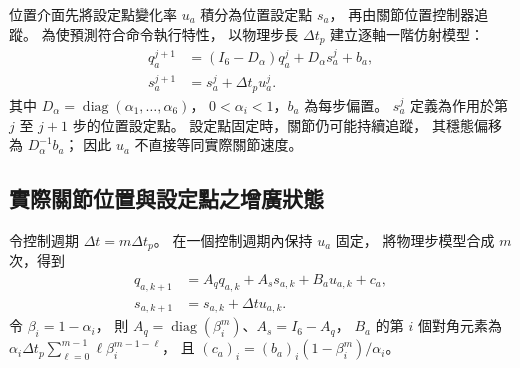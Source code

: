 位置介面先將設定點變化率 $u_a$ 積分為位置設定點 $s_a$，
再由關節位置控制器追蹤。
為使預測符合命令執行特性\cite{grandia2019frequency}，
以物理步長 $\Delta t_p$ 建立逐軸一階仿射模型：
\begin{equation}
    \begin{aligned}
        q_a^{j+1}&=(I_6-D_\alpha)q_a^j+D_\alpha s_a^j+b_a,\\
        s_a^{j+1}&=s_a^j+\Delta t_p u_a^j .
    \end{aligned}
    \label{eq:ch3_physics_step_arm_model}
\end{equation}
其中 $D_\alpha=\operatorname{diag}(\alpha_1,\ldots,\alpha_6)$，
$0<\alpha_i<1$，$b_a$ 為每步偏置。
$s_a^j$ 定義為作用於第 $j$ 至 $j+1$ 步的位置設定點。
設定點固定時，關節仍可能持續追蹤，
其穩態偏移為 $D_\alpha^{-1}b_a$；
因此 $u_a$ 不直接等同實際關節速度。

\subsection{實際關節位置與設定點之增廣狀態}
\label{subsec:augmented_arm_state}

令控制週期 $\Delta t=m\Delta t_p$。
在一個控制週期內保持 $u_a$ 固定，
將物理步模型合成 $m$ 次，得到
\begin{equation}
    \begin{aligned}
        q_{a,k+1}&=A_q q_{a,k}+A_s s_{a,k}+B_a u_{a,k}+c_a,\\
        s_{a,k+1}&=s_{a,k}+\Delta t u_{a,k}.
    \end{aligned}
    \label{eq:ch3_control_step_arm_model}
\end{equation}
令 $\beta_i=1-\alpha_i$，
則 $A_q=\operatorname{diag}(\beta_i^m)$、$A_s=I_6-A_q$，
$B_a$ 的第 $i$ 個對角元素為
$\alpha_i\Delta t_p\sum_{\ell=0}^{m-1}\ell\beta_i^{m-1-\ell}$，
且 $(c_a)_i=(b_a)_i(1-\beta_i^m)/\alpha_i$。

